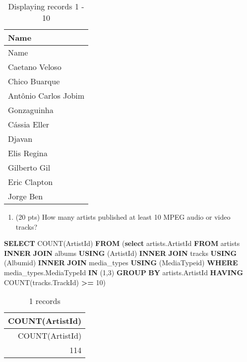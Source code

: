 \documentclass[
]{article}
\newenvironment{Shaded}{\begin{snugshade}}{\end{snugshade}}
\newcommand{\DecValTok}[1]{\textcolor[rgb]{0.00,0.00,0.81}{#1}}
\newcommand{\FunctionTok}[1]{\textcolor[rgb]{0.00,0.00,0.00}{#1}}
\newcommand{\KeywordTok}[1]{\textcolor[rgb]{0.13,0.29,0.53}{\textbf{#1}}}
\newcommand{\NormalTok}[1]{#1}
\newcommand{\OperatorTok}[1]{\textcolor[rgb]{0.81,0.36,0.00}{\textbf{#1}}}
\providecommand{\tightlist}{%
  \setlength{\itemsep}{0pt}\setlength{\parskip}{0pt}}
\begin{document}
\begin{longtable}[]{@{}l@{}}
\caption{Displaying records 1 - 10}\tabularnewline
\toprule
Name \\
\midrule
\endfirsthead
\toprule
Name \\
\midrule
\endhead
Caetano Veloso \\
Chico Buarque \\
Antônio Carlos Jobim \\
Gonzaguinha \\
Cássia Eller \\
Djavan \\
Elis Regina \\
Gilberto Gil \\
Eric Clapton \\
Jorge Ben \\
\bottomrule
\end{longtable}

\begin{enumerate}
\def\labelenumi{\arabic{enumi}.}
\setcounter{enumi}{6}
\tightlist
\item
  (20 pts) How many artists published at least 10 MPEG audio or video
  tracks?
\end{enumerate}

\begin{Shaded}
\begin{Highlighting}[]

\KeywordTok{SELECT} \FunctionTok{COUNT}\NormalTok{(ArtistId)}
\KeywordTok{FROM}\NormalTok{ (}\KeywordTok{select}\NormalTok{ artists.ArtistId }
\KeywordTok{FROM}\NormalTok{ artists }\KeywordTok{INNER} \KeywordTok{JOIN}\NormalTok{ albums }\KeywordTok{USING}\NormalTok{ (ArtistId)}
\KeywordTok{INNER} \KeywordTok{JOIN}\NormalTok{ tracks }\KeywordTok{USING}\NormalTok{ (Albumid)}
\KeywordTok{INNER} \KeywordTok{JOIN}\NormalTok{ media\_types }\KeywordTok{USING}\NormalTok{ (MediaTypeid)}
\KeywordTok{WHERE}\NormalTok{ media\_types.MediaTypeId }\KeywordTok{IN}\NormalTok{ (}\DecValTok{1}\NormalTok{,}\DecValTok{3}\NormalTok{)}
\KeywordTok{GROUP} \KeywordTok{BY}\NormalTok{ artists.ArtistId}
\KeywordTok{HAVING} \FunctionTok{COUNT}\NormalTok{(tracks.TrackId) }\OperatorTok{\textgreater{}=} \DecValTok{10}\NormalTok{)}
\end{Highlighting}
\end{Shaded}

\begin{longtable}[]{@{}r@{}}
\caption{1 records}\tabularnewline
\toprule
COUNT(ArtistId) \\
\midrule
\endfirsthead
\toprule
COUNT(ArtistId) \\
\midrule
\endhead
114 \\
\bottomrule
\end{longtable}
\end{document}
